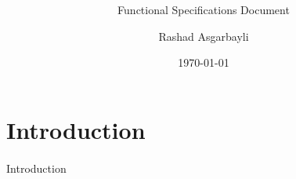 \documentclass[hidelinks, a4paper, 11pt]{scrartcl}
\author{Rashad Asgarbayli}
\title{\vspace{3cm}
\app\vspace{20mm}}
\subtitle{Functional Specifications Document}
\date{\today}
\begin{document}
\maketitle
\thispagestyle{empty}

\newpage

\tableofcontents

\newpage


\section{Introduction}

\paragraph{}Introduction




















\end{document}
